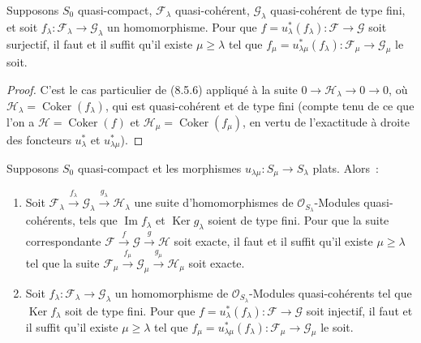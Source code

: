 \begin{corollary}[8.5.7]
\label{IV.8.5.7-fr}
Supposons $S_0$ quasi-compact, $\mathcal F_\lambda$ quasi-cohérent,
$\mathcal G_\lambda$ quasi-cohérent de type fini, et soit
$f_\lambda:\mathcal F_\lambda\to\mathcal G_\lambda$ un homomorphisme. Pour que
$f=u_\lambda^*(f_\lambda):\mathcal F\to\mathcal G$ soit surjectif, il faut et
il suffit qu'il existe $\mu\geq\lambda$ tel que
$f_\mu=u_{\lambda\mu}^*(f_\lambda):\mathcal F_\mu\to\mathcal G_\mu$ le soit.
\end{corollary}

\begin{proof}
C'est le cas particulier de (8.5.6) appliqué à la suite
$0\to\mathcal H_\lambda\to0\to0$, où
$\mathcal H_\lambda=\operatorname{Coker}(f_\lambda)$, qui est quasi-cohérent et
de type fini (compte tenu de ce que l'on a
$\mathcal H=\operatorname{Coker}(f)$ et
$\mathcal H_\mu=\operatorname{Coker}(f_\mu)$, en vertu de l'exactitude à droite
des foncteurs $u_\lambda^*$ et $u_{\lambda\mu}^*$).
\end{proof}

\begin{corollary}[8.5.8]
Supposons $S_0$ quasi-compact et les morphismes
$u_{\lambda\mu}:S_\mu\to S_\lambda$ \textup{plats}. Alors~:
\begin{enumerate}[label=\textup{(\roman*)}]
  \item Soit
  $\mathcal F_\lambda\xrightarrow{f_\lambda}\mathcal G_\lambda
  \xrightarrow{g_\lambda}\mathcal H_\lambda$ une suite d'homomorphismes de
  $\mathcal O_{S_\lambda}$-Modules quasi-cohérents, tels que
  $\operatorname{Im}f_\lambda$ et $\operatorname{Ker}g_\lambda$ soient de type
  fini. Pour que la suite correspondante
  $\mathcal F\xrightarrow{f}\mathcal G\xrightarrow{g}\mathcal H$ soit
  exacte, il faut et il suffit qu'il existe $\mu\geq\lambda$ tel que la suite
  $\mathcal F_\mu\xrightarrow{f_\mu}\mathcal G_\mu
  \xrightarrow{g_\mu}\mathcal H_\mu$ soit exacte.

  \item Soit $f_\lambda:\mathcal F_\lambda\to\mathcal G_\lambda$ un
  homomorphisme de $\mathcal O_{S_\lambda}$-Modules quasi-cohérents tel que
  $\operatorname{Ker}f_\lambda$ soit de type fini. Pour que
  $f=u_\lambda^*(f_\lambda):\mathcal F\to\mathcal G$ soit injectif, il faut et
  il suffit qu'il existe $\mu\geq\lambda$ tel que
  $f_\mu=u_{\lambda\mu}^*(f_\lambda):\mathcal F_\mu\to\mathcal G_\mu$ le soit.
\end{enumerate}
\end{corollary}


